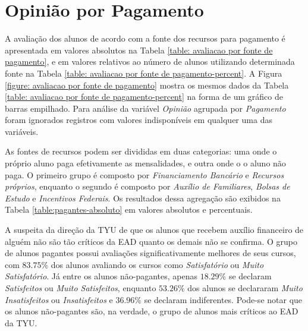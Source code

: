 \documentclass[10pt,a4paper,oneside]{article}
\begin{document}
\clearpage
\FloatBarrier
\section{Opinião por Pagamento}
\label{section:opiniao-pagamento}

A avaliação dos alunos de acordo com a fonte dos recursos para pagamento é apresentada em valores absolutos na Tabela \ref{table: avaliacao por fonte de pagamento}, e em valores relativos ao número de alunos utilizando determinada fonte na Tabela \ref{table: avaliacao por fonte de pagamento-percent}. A Figura \ref{figure: avaliacao por fonte de pagamento} mostra os mesmos dados da Tabela \ref{table: avaliacao por fonte de pagamento-percent} na forma de um gráfico de barras empilhado. Para análise da variável \textit{Opinião} agrupada por \textit{Pagamento} foram ignorados registros com valores indisponíveis em qualquer uma das variáveis. 

As fontes de recursos podem ser divididas em duas categorias: uma onde o próprio aluno paga efetivamente as mensalidades, e outra onde o o aluno não paga. O primeiro grupo é composto por \textit{Financiamento Bancário} e \textit{Recursos próprios}, enquanto o segundo é composto por \textit{Auxílio de Familiares}, \textit{Bolsas de Estudo} e \textit{Incentivos Federais}. Os resultados dessa agregação são exibidos na Tabela \ref{table:pagantes-absoluto} em valores absolutos e percentuais.

A suspeita da direção da TYU de que os alunos que recebem auxílio financeiro de alguém não são tão críticos da EAD quanto os demais não se confirma. O grupo de alunos pagantes possui avaliações significativamente melhores de seus cursos, com $83.75\%$ dos alunos avaliando os cursos como \textit{Satisfatório} ou \textit{Muito Satisfatório}. Já entre os alunos não-pagantes, apenas $18.29\%$ se declaram \textit{Satisfeitos} ou \textit{Muito Satisfeitos}, enquanto $53.26\%$ dos alunos se declararam \textit{Muito Insatisfeitos} ou \textit{Insatisfeitos} e $36.96\%$ se declaram indiferentes. Pode-se notar que os alunos não-pagantes são, na verdade, o grupo de alunos mais críticos ao EAD da TYU.
\end{document}
